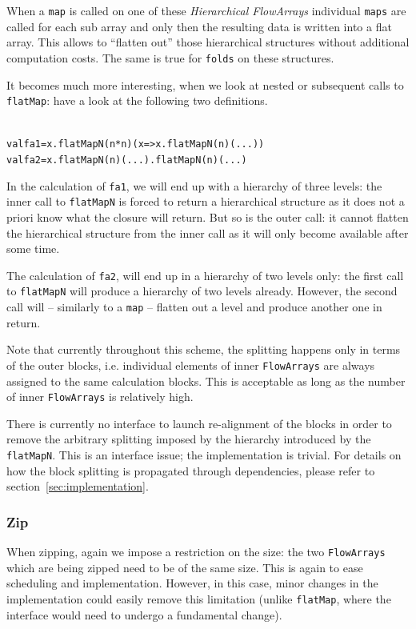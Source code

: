 \documentclass[runningheads,a4paper,fleqn]{llncs}
\begin{document}
When a \texttt{map} is called on one of these \emph{Hierarchical
  FlowArrays} individual \texttt{maps} are called for each sub array
and only then the resulting data is written into a flat array. This
allows to ``flatten out'' those hierarchical structures without
additional computation costs. The same is true for \texttt{folds} on
these structures.

It becomes much more interesting, when we look at nested or subsequent
calls to \texttt{flatMap}: have a look at the following two
definitions.
\begin{alltt}
{\scriptsize
val fa1 = x.flatMapN(n*n)(x => x.flatMapN(n)( ... ))
val fa2 = x.flatMapN(n)(...).flatMapN(n)(...)
}
\end{alltt}
In the calculation of \texttt{fa1}, we will end up with a hierarchy of
three levels: the inner call to \texttt{flatMapN} is forced to return
a hierarchical structure as it does not a priori know what the closure
will return. But so is the outer call: it cannot flatten the hierarchical
structure from the inner call as it will only become available after
some time.

The calculation of \texttt{fa2}, will end up in a hierarchy of
two levels only: the first call to \texttt{flatMapN} will produce a 
hierarchy of two levels already. However, the second call will --
similarly to a \texttt{map} -- flatten out a level and produce another
one in return.

Note that currently throughout this scheme, the splitting happens only
in terms of the outer 
blocks, i.e. individual elements of inner \texttt{FlowArrays} are always
assigned to the same calculation blocks. This is acceptable as long as
the number of inner \texttt{FlowArrays} is relatively high.

There is currently no interface to launch re-alignment of the blocks
in order to remove the arbitrary splitting imposed by the hierarchy
introduced by the \texttt{flatMapN}. This is an interface issue; the
implementation is trivial. For details on how the block splitting is
propagated through dependencies, please refer to
section~\ref{sec:implementation}.

\subsubsection{Zip}
When zipping, again we impose a restriction on the size: 
the two \texttt{FlowArrays} which are being zipped need to be of the same
size. This is again to ease scheduling and implementation. However, in
this case, minor changes in the implementation could easily remove
this limitation (unlike \texttt{flatMap}, where the interface would
need to undergo a fundamental change).
\end{document}
